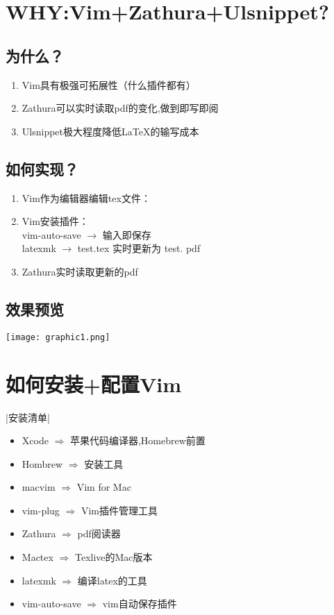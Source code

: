 \documentclass[UTF_8]{ctexart}
\begin{document}
\clearpage
\section{WHY:Vim+Zathura+Ulsnippet?}

\subsection{为什么？}
\begin{enumerate}
\item Vim具有极强可拓展性（什么插件都有）
\item Zathura可以实时读取pdf的变化,做到即写即阅
\item Ulsnippet极大程度降低{\LaTeX}的输写成本
		
\end{enumerate}


\subsection{如何实现？}
\begin{enumerate}
		\item Vim作为编辑器编辑tex文件：		
		\item Vim安装插件：\\
			vim-auto-save $\longrightarrow$ 输入即保存\\
			latexmk $\longrightarrow$ test.tex 实时更新为 test. pdf
		\item Zathura实时读取更新的pdf
		
\end{enumerate}


\subsection{效果预览}
\centering
\texttt{[image: graphic1.png]}

\heiti
{}


\clearpage
\section{如何安装+配置Vim}
\centerline{|安装清单|}
\begin{itemize}
    \item Xcode $\Rightarrow$  苹果代码编译器,Homebrew前置
		\item Hombrew $\Rightarrow$ 安装工具
		\item macvim $\Rightarrow$ Vim for Mac
		\item vim-plug $\Rightarrow$ Vim插件管理工具
		\item Zathura  $\Rightarrow$ pdf阅读器
		\item Mactex $\Rightarrow$ Texlive的Mac版本
		\item latexmk  $\Rightarrow$ 编译latex的工具
		\item vim-auto-save $\Rightarrow$ vim自动保存插件
\end{itemize}
\end{document}
